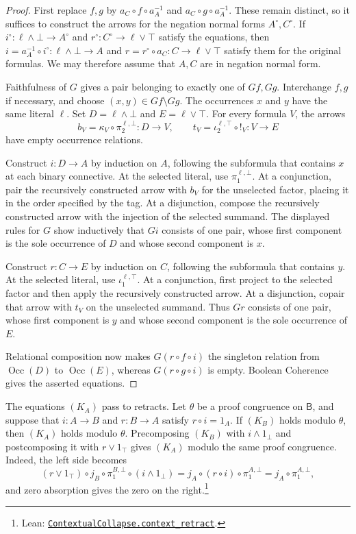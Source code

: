 \documentclass[11pt]{article}
\newcommand{\B}{\mathsf B}
\newcommand{\Occ}{\operatorname{Occ}}
\begin{document}
\begin{proof}
First replace $f,g$ by $a_C\circ f\circ a_A^{-1}$ and
$a_C\circ g\circ a_A^{-1}$. These remain distinct, so it suffices to
construct the arrows for the negation normal forms $A^\circ,C^\circ$.
If
$i^\circ:\ell\wedge\bot\to A^\circ$ and
$r^\circ:C^\circ\to\ell\vee\top$ satisfy the equations,
then $i=a_A^{-1}\circ i^\circ:\ell\wedge\bot\to A$ and
$r=r^\circ\circ a_C:C\to\ell\vee\top$ satisfy them for the original
formulas.
We may therefore assume that $A,C$ are in negation normal form.

Faithfulness of $G$ gives a pair belonging to exactly one of $Gf,Gg$.
Interchange $f,g$ if necessary, and choose
$(x,y)\in Gf\setminus Gg$. The occurrences $x$ and $y$ have the same
literal $\ell$. Set $D=\ell\wedge\bot$ and $E=\ell\vee\top$.
For every formula $V$, the arrows
\[
 b_V=\kappa_V\circ\pi_2^{\ell,\bot}:D\to V,
 \qquad
 t_V=\iota_2^{\ell,\top}\circ!_V:V\to E
\]
have empty occurrence relations.

Construct $i:D\to A$ by induction on $A$, following the subformula
that contains $x$ at each binary connective. At the selected literal, use $\pi_1^{\ell,\bot}$.
At a conjunction, pair the recursively constructed arrow with $b_V$
for the unselected factor, placing it in the order specified by the
tag. At a disjunction, compose the recursively constructed arrow
with the injection of the selected summand. The displayed rules for
$G$ show inductively that $Gi$ consists of one pair, whose first component
is the sole occurrence of $D$ and whose second component is $x$.

Construct $r:C\to E$ by induction on $C$, following the subformula
that contains $y$.
At the selected literal, use $\iota_1^{\ell,\top}$.
At a conjunction, first project to the selected factor and then apply
the recursively constructed arrow. At a disjunction, copair that
arrow with $t_V$ on the unselected summand. Thus $Gr$ consists of one pair,
whose first component is $y$ and whose second component is the sole
occurrence of $E$.

Relational composition now makes $G(r\circ f\circ i)$ the singleton
relation from $\Occ(D)$ to $\Occ(E)$, whereas
$G(r\circ g\circ i)$ is empty. Boolean Coherence gives the asserted
equations.
\end{proof}

The equations $(K_A)$ pass to retracts. Let $\theta$ be a proof
congruence on $\B$, and suppose that $i:A\to B$ and $r:B\to A$
satisfy $r\circ i=1_A$. If $(K_B)$ holds modulo $\theta$, then
$(K_A)$ holds modulo $\theta$.
Precomposing $(K_B)$ with $i\wedge1_\bot$ and postcomposing it
with $r\vee1_\top$ gives $(K_A)$ modulo the same proof
congruence. Indeed, the left side becomes
\[
 (r\vee1_\top)\circ j_B\circ\pi_1^{B,\bot}\circ(i\wedge1_\bot)
 =j_A\circ(r\circ i)\circ\pi_1^{A,\bot}
 =j_A\circ\pi_1^{A,\bot},
\]
and zero absorption gives the zero on the right.\footnote{\raggedright Lean:
\href{https://github.com/flengyel/Dosen-Petric-Maximality/blob/5dbee39bea09539bd130f729e82636419f71f920/DosenPetric/Substitution.lean\#L74}{\texttt{ContextualCollapse.\allowbreak{}context\_retract}}.}
\end{document}
